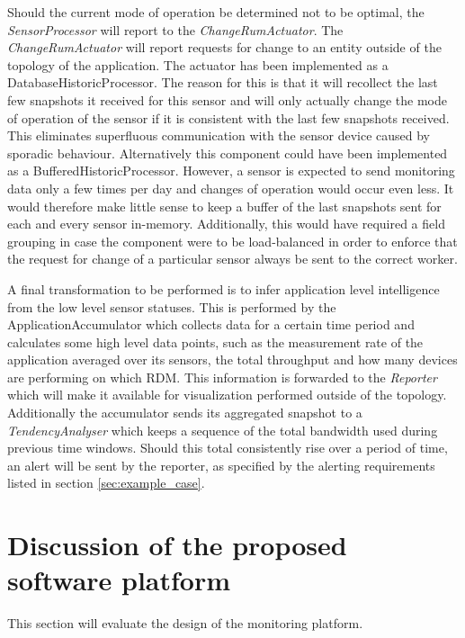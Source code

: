 Should the current mode of operation be determined not to be optimal, the \emph{SensorProcessor} will report to the \emph{ChangeRumActuator}. The \emph{ChangeRumActuator} will report requests for change to an entity outside of the topology of the application. The actuator has been implemented as a DatabaseHistoricProcessor. The reason for this is that it will recollect the last few snapshots it received for this sensor and will only actually change the mode of operation of the sensor if it is consistent with the last few snapshots received. This eliminates superfluous communication with the sensor device caused by sporadic behaviour. Alternatively this component could have been implemented as a BufferedHistoricProcessor. However, a sensor is expected to send monitoring data only a few times per day and changes of operation would occur even less. It would therefore make little sense to keep a buffer of the last snapshots sent for each and every sensor in-memory. Additionally, this would have required a field grouping in case the component were to be load-balanced in order to enforce that the request for change of a particular sensor always be sent to the correct worker.

A final transformation to be performed is to infer application level intelligence from the low level sensor statuses. This is performed by the ApplicationAccumulator which collects data for a certain time period and calculates some high level data points, such as the measurement rate of the application averaged over its sensors, the total throughput and how many devices are performing on which RDM. This information is forwarded to the \emph{Reporter} which will make it available for visualization performed outside of the topology. Additionally the accumulator sends its aggregated snapshot to a \emph{TendencyAnalyser} which keeps a sequence of the total bandwidth used during previous time windows. Should this total consistently rise over a period of time, an alert will be sent by the reporter, as specified by the alerting requirements listed in section \ref{sec:example_case}.
	
\section{Discussion of the proposed software platform}
This section will evaluate the design of the monitoring platform. 

